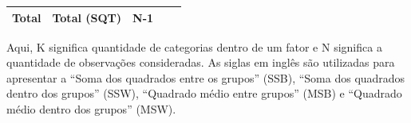 \documentclass[
]{book}
\newenvironment{Shaded}{\begin{snugshade}}{\end{snugshade}}
\newcommand{\DataTypeTok}[1]{\textcolor[rgb]{0.13,0.29,0.53}{#1}}
\newcommand{\KeywordTok}[1]{\textcolor[rgb]{0.13,0.29,0.53}{\textbf{#1}}}
\newcommand{\NormalTok}[1]{#1}
\newcommand{\OperatorTok}[1]{\textcolor[rgb]{0.81,0.36,0.00}{\textbf{#1}}}
\newcommand{\OtherTok}[1]{\textcolor[rgb]{0.56,0.35,0.01}{#1}}
\newcommand{\StringTok}[1]{\textcolor[rgb]{0.31,0.60,0.02}{#1}}
\begin{document}
\begin{longtable}[]{@{}lllll@{}}
\begin{minipage}[t]{0.17\columnwidth}\raggedright
Total\strut
\end{minipage} & \begin{minipage}[t]{0.17\columnwidth}\raggedright
Total (SQT)\strut
\end{minipage} & \begin{minipage}[t]{0.17\columnwidth}\raggedright
N-1\strut
\end{minipage} & \begin{minipage}[t]{0.17\columnwidth}\raggedright
\strut
\end{minipage} & \begin{minipage}[t]{0.17\columnwidth}\raggedright
\strut
\end{minipage}\tabularnewline
\bottomrule
\end{longtable}

Aqui, K significa quantidade de categorias dentro de um fator e N significa a quantidade de observações consideradas. As siglas em inglês são utilizadas para apresentar a ``Soma dos quadrados entre os grupos'' (SSB), ``Soma dos quadrados dentro dos grupos'' (SSW), ``Quadrado médio entre grupos'' (MSB) e ``Quadrado médio dentro dos grupos'' (MSW).

\begin{Shaded}
\end{Shaded}
\end{document}
